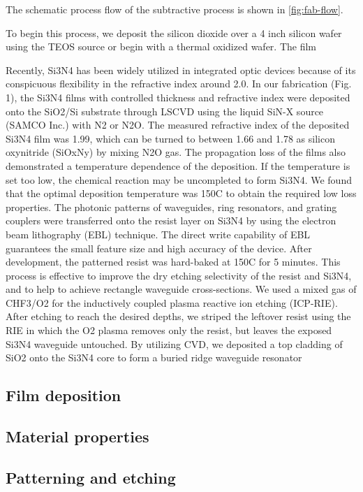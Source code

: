 The schematic process flow of the subtractive process is shown in \autoref{fig:fab-flow}. 

To begin this process, we deposit the silicon dioxide over a 4 inch silicon wafer using the TEOS source or begin with a thermal oxidized wafer. The film

Recently, Si3N4 has been widely utilized in integrated optic devices because of its conspicuous flexibility in the refractive index around 2.0. In our fabrication (Fig. 1), the Si3N4 films with controlled thickness and refractive index were deposited onto the SiO2/Si substrate through LSCVD using the liquid SiN-X source (SAMCO Inc.) with N2 or N2O. The measured refractive index of the deposited Si3N4 film was 1.99, which can be turned to between 1.66 and 1.78 as silicon oxynitride (SiOxNy) by mixing N2O gas. The propagation loss of the films also demonstrated a temperature dependence of the deposition. If the temperature is set too low, the chemical reaction may be uncompleted to form Si3N4. We found that the optimal deposition temperature was 150C to obtain the required low loss properties. The photonic patterns of waveguides, ring resonators, and grating couplers were transferred onto the resist
layer on Si3N4 by using the electron beam lithography (EBL) technique. The direct write capability of EBL guarantees the small feature size and high accuracy of the device. After development, the patterned resist was hard-baked at 150C for 5 minutes. This process is effective to improve the dry etching selectivity of the resist and Si3N4, and to help to achieve rectangle waveguide cross-sections. We used a mixed gas of CHF3/O2 for the inductively coupled plasma reactive ion etching (ICP-RIE). After etching to reach the desired depths, we striped the leftover resist using the RIE in which the O2 plasma removes only the resist, but leaves the exposed Si3N4 waveguide untouched. By utilizing CVD, we deposited a top cladding of SiO2 onto the Si3N4 core to form a buried ridge waveguide resonator

\subsection{Film deposition}
\subsection{Material properties}
\subsection{Patterning and etching}
